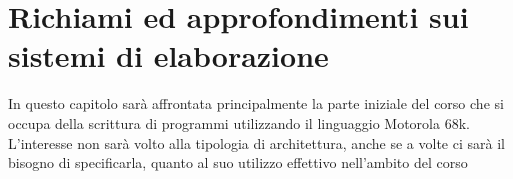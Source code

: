 \chapter{Richiami ed approfondimenti sui sistemi di
elaborazione}
In questo capitolo sarà affrontata principalmente la parte iniziale del corso che si occupa della scrittura di programmi utilizzando il linguaggio Motorola 68k. L'interesse non sarà volto alla tipologia di architettura, anche se a volte ci sarà il bisogno di specificarla, quanto al suo utilizzo effettivo nell'ambito del corso




